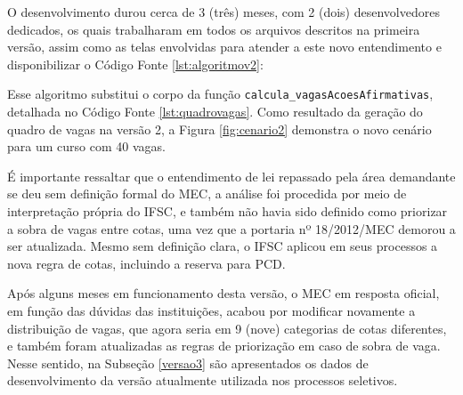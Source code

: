 \newpage
O desenvolvimento durou cerca de 3 (três) meses, com 2 (dois) desenvolvedores dedicados, os quais trabalharam em todos os arquivos descritos na primeira versão, assim como as telas envolvidas para atender a este novo entendimento e disponibilizar o Código Fonte \ref{lst:algoritmov2}:



Esse algoritmo substitui o corpo da função \texttt{calcula\_vagasAcoesAfirmativas}, detalhada no Código Fonte \ref{lst:quadrovagas}. Como resultado da geração do quadro de vagas na versão 2, a Figura \ref{fig:cenario2} demonstra o novo cenário para um curso com 40 vagas.



É importante ressaltar que o entendimento de lei repassado pela área demandante se deu sem definição formal do \gls{MEC}, a análise foi procedida por meio de interpretação própria do \gls{IFSC}, e também não havia sido definido como priorizar a sobra de vagas entre cotas, uma vez que a portaria nº 18/2012/MEC  demorou a ser atualizada. Mesmo sem definição clara, o \gls{IFSC} aplicou em seus processos a nova regra de cotas, incluindo a reserva para \gls{PCD}.

Após alguns meses em funcionamento desta versão, o \gls{MEC} em resposta oficial, em função das dúvidas das instituições, acabou por modificar novamente a distribuição de vagas, que agora seria em 9 (nove) categorias de cotas diferentes, e também foram atualizadas as regras de priorização em caso de sobra de vaga. Nesse sentido, na Subseção \ref{versao3} são apresentados os dados de desenvolvimento da versão atualmente utilizada nos processos seletivos.